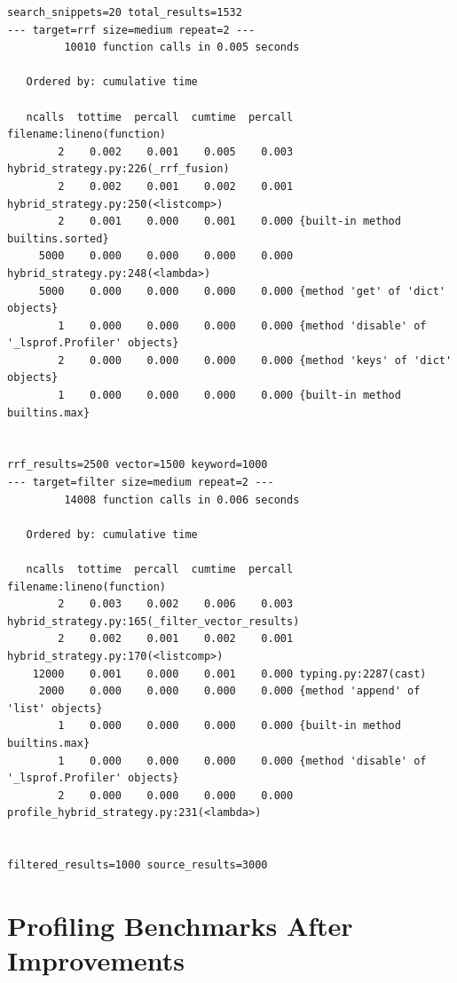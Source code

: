 \documentclass[a4paper,12pt]{article}
\begin{document}
\begin{lstlisting}[basicstyle=\ttfamily\fontsize{9}{9}\selectfont]
search_snippets=20 total_results=1532
--- target=rrf size=medium repeat=2 ---
         10010 function calls in 0.005 seconds

   Ordered by: cumulative time

   ncalls  tottime  percall  cumtime  percall filename:lineno(function)
        2    0.002    0.001    0.005    0.003 hybrid_strategy.py:226(_rrf_fusion)
        2    0.002    0.001    0.002    0.001 hybrid_strategy.py:250(<listcomp>)
        2    0.001    0.000    0.001    0.000 {built-in method builtins.sorted}
     5000    0.000    0.000    0.000    0.000 hybrid_strategy.py:248(<lambda>)
     5000    0.000    0.000    0.000    0.000 {method 'get' of 'dict' objects}
        1    0.000    0.000    0.000    0.000 {method 'disable' of '_lsprof.Profiler' objects}
        2    0.000    0.000    0.000    0.000 {method 'keys' of 'dict' objects}
        1    0.000    0.000    0.000    0.000 {built-in method builtins.max}


rrf_results=2500 vector=1500 keyword=1000
--- target=filter size=medium repeat=2 ---
         14008 function calls in 0.006 seconds

   Ordered by: cumulative time

   ncalls  tottime  percall  cumtime  percall filename:lineno(function)
        2    0.003    0.002    0.006    0.003 hybrid_strategy.py:165(_filter_vector_results)
        2    0.002    0.001    0.002    0.001 hybrid_strategy.py:170(<listcomp>)
    12000    0.001    0.000    0.001    0.000 typing.py:2287(cast)
     2000    0.000    0.000    0.000    0.000 {method 'append' of 'list' objects}
        1    0.000    0.000    0.000    0.000 {built-in method builtins.max}
        1    0.000    0.000    0.000    0.000 {method 'disable' of '_lsprof.Profiler' objects}
        2    0.000    0.000    0.000    0.000 profile_hybrid_strategy.py:231(<lambda>)


filtered_results=1000 source_results=3000 
\end{lstlisting}

\section{Profiling Benchmarks After Improvements}
\label{app:prof_improved}
\end{document}
